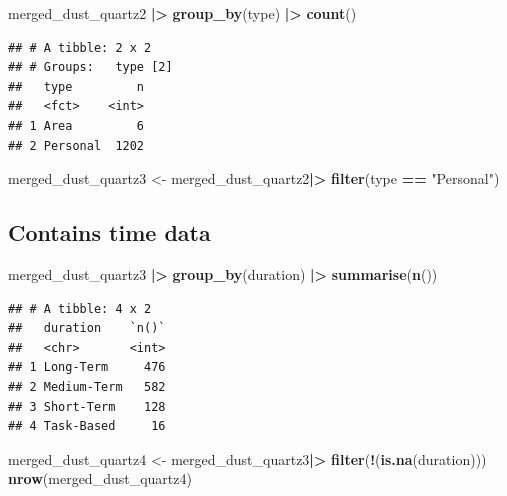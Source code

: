 \documentclass[
]{article}
\newenvironment{Shaded}{\begin{snugshade}}{\end{snugshade}}
\newcommand{\FunctionTok}[1]{\textcolor[rgb]{0.13,0.29,0.53}{\textbf{#1}}}
\newcommand{\NormalTok}[1]{#1}
\newcommand{\OtherTok}[1]{\textcolor[rgb]{0.56,0.35,0.01}{#1}}
\newcommand{\SpecialCharTok}[1]{\textcolor[rgb]{0.81,0.36,0.00}{\textbf{#1}}}
\newcommand{\StringTok}[1]{\textcolor[rgb]{0.31,0.60,0.02}{#1}}
\begin{document}
\begin{Shaded}
\begin{Highlighting}[]
\NormalTok{merged\_dust\_quartz2 }\SpecialCharTok{|\textgreater{}} 
  \FunctionTok{group\_by}\NormalTok{(type) }\SpecialCharTok{|\textgreater{}} 
  \FunctionTok{count}\NormalTok{() }
\end{Highlighting}
\end{Shaded}

\begin{verbatim}
## # A tibble: 2 x 2
## # Groups:   type [2]
##   type         n
##   <fct>    <int>
## 1 Area         6
## 2 Personal  1202
\end{verbatim}

\begin{Shaded}
\begin{Highlighting}[]
\NormalTok{merged\_dust\_quartz3 }\OtherTok{\textless{}{-}}\NormalTok{ merged\_dust\_quartz2}\SpecialCharTok{|\textgreater{}} 
  \FunctionTok{filter}\NormalTok{(type }\SpecialCharTok{==} \StringTok{"Personal"}\NormalTok{)}
\end{Highlighting}
\end{Shaded}

\subsection{Contains time data}\label{contains-time-data-1}

\begin{Shaded}
\begin{Highlighting}[]
\NormalTok{merged\_dust\_quartz3 }\SpecialCharTok{|\textgreater{}} 
  \FunctionTok{group\_by}\NormalTok{(duration) }\SpecialCharTok{|\textgreater{}} 
  \FunctionTok{summarise}\NormalTok{(}\FunctionTok{n}\NormalTok{()) }
\end{Highlighting}
\end{Shaded}

\begin{verbatim}
## # A tibble: 4 x 2
##   duration    `n()`
##   <chr>       <int>
## 1 Long-Term     476
## 2 Medium-Term   582
## 3 Short-Term    128
## 4 Task-Based     16
\end{verbatim}

\begin{Shaded}
\begin{Highlighting}[]
\NormalTok{merged\_dust\_quartz4 }\OtherTok{\textless{}{-}}\NormalTok{ merged\_dust\_quartz3}\SpecialCharTok{|\textgreater{}} 
 \FunctionTok{filter}\NormalTok{(}\SpecialCharTok{!}\NormalTok{(}\FunctionTok{is.na}\NormalTok{(duration)))}
\FunctionTok{nrow}\NormalTok{(merged\_dust\_quartz4)}
\end{Highlighting}
\end{Shaded}
\end{document}
